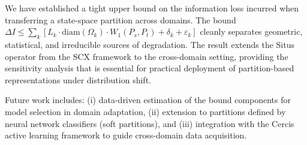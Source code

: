 \documentclass[12pt,a4paper]{article}
\newcommand{\Wass}{W_1}
\newcommand{\diam}{\mathrm{diam}}
\begin{document}
We have established a tight upper bound on the information loss incurred
when transferring a state-space partition across domains.  The bound
$\Delta I \leq \sum_k[L_k\cdot\diam(\Omega_k)\cdot\Wass(P_s,P_t) +
\delta_k + \varepsilon_k]$ cleanly separates geometric, statistical, and
irreducible sources of degradation.  The result extends the Situs operator
from the SCX framework to the cross-domain setting, providing the
sensitivity analysis that is essential for practical deployment of
partition-based representations under distribution shift.

\medskip\noindent
Future work includes: (i) data-driven estimation of the bound components
for model selection in domain adaptation, (ii) extension to partitions
defined by neural network classifiers (soft partitions), and (iii)
integration with the Cercis active learning framework to guide
cross-domain data acquisition.
\end{document}
